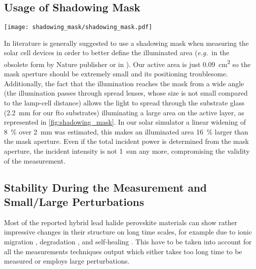 	\subsection{Usage of Shadowing Mask}

		\begin{SCfigure}
			\centering
			\texttt{[image: shadowing\_mask/shadowing\_mask.pdf]}
			\label{fig:shadowing_mask}
		\end{SCfigure}

		In literature is generally suggested to use a shadowing mask when measuring the solar cell devices in order to better define the illuminated area (\textsl{e.g.}\ in the obsolete \cite{Brinser2017} form by Nature publisher \cite{NatureResearch2017} or in \cite{Christians2015}).
		Our active area is just \SI{0.09}{\square\cm} so the mask aperture should be extremely small and its positioning troublesome.
		Additionally, the fact that the illumination reaches the mask from a wide angle (the illumination passes through spread lenses, whose size is not small compared to the lamp-cell distance) allows the light to spread through the substrate glass (\SI{2.2}{\mm} for our \gls{fto} substrates) illuminating a large area on the active layer, as represented in \cref{fig:shadowing_mask}.
		In our solar simulator a linear widening of 8~\% over \SI{2}{\mm} was estimated, this makes an illuminated area 16~\% larger than the mask aperture.
		Even if the total incident power is determined from the mask aperture, the incident intensity is not 1~sun any more, compromising the validity of the measurement.


	\subsection{Stability During the Measurement and Small\-/Large Perturbations}

		Most of the reported hybrid lead halide perovskite materials can show rather impressive changes in their structure on long time scales, for example due to ionic migration \cite{Calado2016}, degradation \cite{OKane2019}, and self-healing \cite{Ceratti2018}.
		This have to be taken into account for all the measurements techniques output which either takes too long time to be measured or employs large perturbations.


